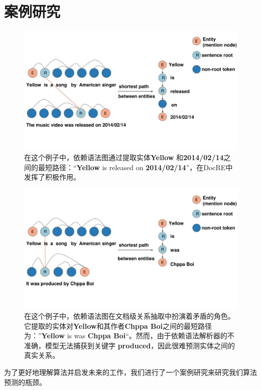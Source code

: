 \documentclass[bachelor]{thesis-uestc}
\begin{document}
\section{案例研究}
\begin{figure}[t]
    \includegraphics[width=\linewidth]{misc/case1.pdf}
    \caption{ 在这个例子中，依赖语法图通过提取实体\textbf{Yellow} 和\textbf{2014/02/14}之间的最短路径：“\textbf{Yellow} is released on \textbf{2014/02/14}”，在DocRE中发挥了积极作用。
    } 
\end{figure}\label{fig_casea}
\begin{figure}[t]
    \includegraphics[width=\linewidth]{misc/case2.pdf}
    \caption{在这个例子中，依赖语法图在文档级关系抽取中扮演着矛盾的角色。它提取的实体对\textbf{Yellow}和其作者\textbf{Chppa Boi}之间的最短路径为：”\textbf{Yellow} is was \textbf{Chppa Boi}“。然而，由于依赖语法解析器的不准确，模型无法捕获到关键字 \textbf{produced}，因此很难预测实体之间的真实关系。}
\end{figure}\label{fig_caseb}

为了更好地理解算法并启发未来的工作，我们进行了一个案例研究来研究我们算法预测的瓶颈。\par
\end{document}
